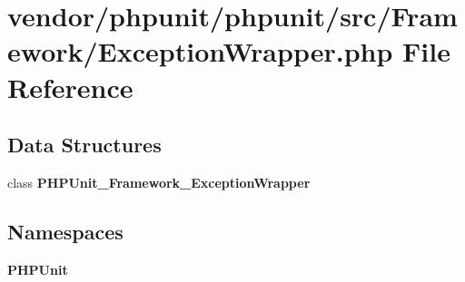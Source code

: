 \section{vendor/phpunit/phpunit/src/\+Framework/\+Exception\+Wrapper.php File Reference}
\label{_exception_wrapper_8php}
\subsection*{Data Structures}
\begin{DoxyCompactItemize}
\item 
class {\bf P\+H\+P\+Unit\+\_\+\+Framework\+\_\+\+Exception\+Wrapper}
\end{DoxyCompactItemize}
\subsection*{Namespaces}
\begin{DoxyCompactItemize}
\item 
 {\bf P\+H\+P\+Unit}
\end{DoxyCompactItemize}
